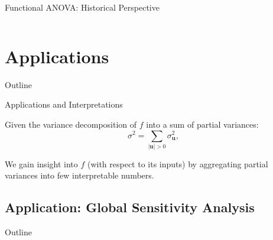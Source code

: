 \documentclass[english,aspectratio=169]{beamer}
\renewcommand{\emph}[1]{\textcolor[HTML]{006d2c}{\fontseries{sb}\selectfont #1}}
\begin{document}
\begin{frame}[fragile]{Functional ANOVA: Historical Perspective}
\begin{columns}[T,onlytextwidth]
\begin{column}{0.40\textwidth}
  \end{column}
\end{columns}

\end{frame}

\section{Applications}

\begin{frame}{Outline}
  \tableofcontents[currentsection]
\end{frame}

\begin{frame}[fragile]{Applications and Interpretations}
\small

Given the variance decomposition of $f$ into a sum of \emph{partial variances}:
\begin{equation*}
  \sigma^2 = \sum_{\lvert \bm{u} \rvert > 0} \sigma_{\bm{u}}^2,
\end{equation*}

\begin{exampleblock}{}
  \centering
  We gain insight into $f$ (with respect to its inputs) by \emph{aggregating}
  partial variances into few interpretable numbers.    
\end{exampleblock}

\end{frame}

\subsection{Application: Global Sensitivity Analysis}

\begin{frame}{Outline}
  \tableofcontents[currentsubsection]
\end{frame}
\end{document}
